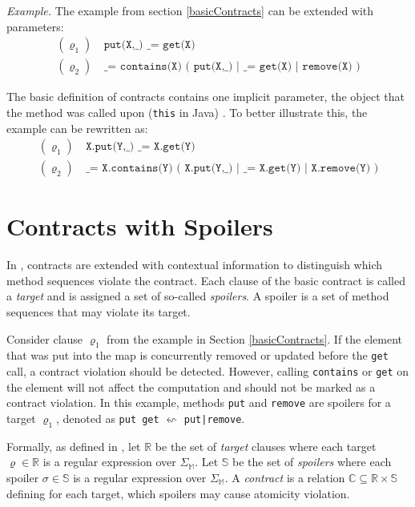 \emph{Example.} The example from section \ref{basicContracts} can be extended
with parameters:
\begin{align*}
    (\varrho_1) &\ \texttt{put(X,\_) \_ = get(X)}\\
    (\varrho_2) &\ \texttt{\_ = contains(X) ( put(X,\_) | \_ = get(X) |
    remove(X) )}
\end{align*}

The basic definition of contracts contains one implicit parameter, the object
that the method was called upon (\texttt{this} in Java) \cite{FITPUB10817}. To
better illustrate this, the example can be rewritten as:
\begin{align*}
    (\varrho_1) &\ \texttt{X.put(Y,\_) \_ = X.get(Y)}\\
    (\varrho_2) &\ \texttt{\_ = X.contains(Y) ( X.put(Y,\_) | \_ = X.get(Y) |
    X.remove(Y) )}
\end{align*}


\section{Contracts with Spoilers}
\label{contractsWithSpoilers}

In \cite{contracts}, contracts are extended with contextual information to
distinguish which method sequences violate the contract. Each clause of the
basic contract is called a \emph{target} and is assigned a set of so-called
\emph{spoilers}. A spoiler is a set of method sequences that may violate its
target.

Consider clause $\varrho_1$ from the example in Section \ref{basicContracts}. If
the element that was put into the map is concurrently removed or updated before
the \texttt{get} call, a contract violation should be detected.  However,
calling \texttt{contains} or \texttt{get} on the element will not affect the
computation and should not be marked as a contract violation. In this example,
methods \texttt{put} and \texttt{remove} are spoilers for a target
$\varrho_1$, denoted as \texttt{put get} $\leftsquigarrow$ \texttt{put|remove}.


Formally, as defined in \cite{contracts}, let $\mathbb{R}$ be the set of
\emph{target} clauses where each target $\varrho \in \mathbb{R}$ is a regular
expression over $\Sigma_\mathbb{M}$. Let $\mathbb{S}$ be the set of
\emph{spoilers} where each spoiler $\sigma \in \mathbb{S}$ is a regular
expression over $\Sigma_\mathbb{M}$. A \emph{contract} is a relation $\mathbb{C}
\subseteq \mathbb{R} \times \mathbb{S}$ defining for each target, which spoilers
may cause atomicity violation.

